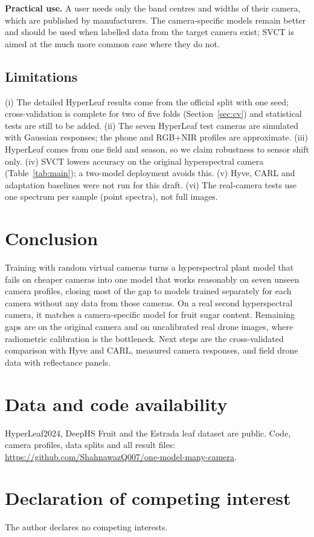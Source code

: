 \documentclass[preprint,12pt,authoryear]{elsarticle}
\def\bibsty{elsarticle-harv}
\def\bibsty{plainnat}
\begin{document}
\textbf{Practical use.} A user needs only the band centres and widths of their camera, which are published by
manufacturers. The camera-specific models remain better and should be used when labelled data from the target camera
exist; SVCT is aimed at the much more common case where they do not.

\subsection{Limitations}
\label{sec:limits}
(i) The detailed HyperLeaf results come from the official split with one seed; cross-validation is complete for two
of five folds (Section~\ref{sec:cv}) and statistical tests are still to be added. (ii) The seven HyperLeaf test cameras are simulated
with Gaussian responses; the phone and RGB+NIR profiles are approximate. (iii) HyperLeaf comes from one field and season,
so we claim robustness to sensor shift only. (iv) SVCT lowers accuracy on the original hyperspectral camera
(Table~\ref{tab:main}); a two-model deployment avoids this. (v) Hyve, CARL and adaptation baselines were not run for
this draft. (vi) The real-camera tests use one spectrum per sample (point spectra), not full images.

\section{Conclusion}
Training with random virtual cameras turns a hyperspectral plant model that fails on cheaper cameras into one model
that works reasonably on seven unseen camera profiles, closing most of the gap to models trained separately for each
camera without any data from those cameras. On a real second hyperspectral camera, it matches a camera-specific model
for fruit sugar content. Remaining gaps are on the original camera and on uncalibrated real drone images, where
radiometric calibration is the bottleneck. Next steps are the cross-validated comparison with Hyve and CARL, measured
camera responses, and field drone data with reflectance panels.

\section*{Data and code availability}
HyperLeaf2024, DeepHS Fruit and the Estrada leaf dataset are public. Code, camera profiles, data splits and all result
files: \url{https://github.com/ShahnawazQ007/one-model-many-camera}.

\section*{Declaration of competing interest}
The author declares no competing interests.



\end{document}
